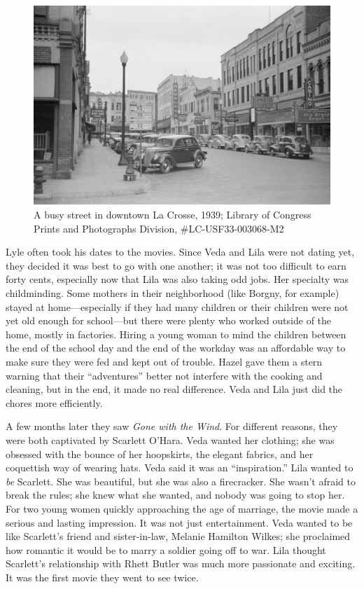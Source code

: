 \documentclass[
  letterpaper,
]{book}
\begin{document}
\begin{figure}[H]

{\centering \includegraphics[width=1\linewidth,height=\textheight,keepaspectratio]{images/Akou11.jpeg}

}

\caption[A busy street in downtown La Crosse, 1939]{A busy street in
downtown La Crosse, 1939; Library of Congress Prints and Photographs
Division, \#LC-USF33-003068-M2}

\end{figure}%

Lyle often took his dates to the movies. Since Veda and Lila were not
dating yet, they decided it was best to go with one another; it was not
too difficult to earn forty cents, especially now that Lila was also
taking odd jobs. Her specialty was childminding. Some mothers in their
neighborhood (like Borgny, for example) stayed at home---especially if
they had many children or their children were not yet old enough for
school---but there were plenty who worked outside of the home, mostly in
factories. Hiring a young woman to mind the children between the end of
the school day and the end of the workday was an affordable way to make
sure they were fed and kept out of trouble. Hazel gave them a stern
warning that their ``adventures'' better not interfere with the cooking
and cleaning, but in the end, it made no real difference. Veda and Lila
just did the chores more efficiently.

A few months later they saw \emph{Gone with the Wind}. For different
reasons, they were both captivated by Scarlett O'Hara. Veda wanted her
clothing; she was obsessed with the bounce of her hoopskirts, the
elegant fabrics, and her coquettish way of wearing hats. Veda said it
was an ``inspiration.'' Lila wanted to \emph{be} Scarlett. She was
beautiful, but she was also a firecracker. She wasn't afraid to break
the rules; she knew what she wanted, and nobody was going to stop her.
For two young women quickly approaching the age of marriage, the movie
made a serious and lasting impression. It was not just entertainment.
Veda wanted to be like Scarlett's friend and sister-in-law, Melanie
Hamilton Wilkes; she proclaimed how romantic it would be to marry a
soldier going off to war. Lila thought Scarlett's relationship with
Rhett Butler was much more passionate and exciting. It was the first
movie they went to see twice.
\end{document}
